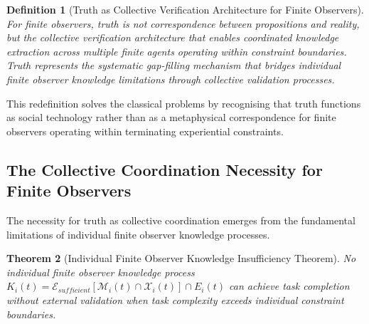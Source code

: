 \documentclass{article}
\newtheorem{theorem}{Theorem}[section]
\newtheorem{definition}[theorem]{Definition}
\begin{document}
\begin{definition}[Truth as Collective Verification Architecture for Finite Observers]
For finite observers, truth is not correspondence between propositions and reality, but the collective verification architecture that enables coordinated knowledge extraction across multiple finite agents operating within constraint boundaries. Truth represents the systematic gap-filling mechanism that bridges individual finite observer knowledge limitations through collective validation processes.
\end{definition}

This redefinition solves the classical problems by recognising that truth functions as social technology rather than as a metaphysical correspondence for finite observers operating within terminating experiential constraints.

\subsection{The Collective Coordination Necessity for Finite Observers}

The necessity for truth as collective coordination emerges from the fundamental limitations of individual finite observer knowledge processes.

\begin{theorem}[Individual Finite Observer Knowledge Insufficiency Theorem]
No individual finite observer knowledge process $K_i(t) = \mathcal{E}_{sufficient}[\mathcal{M}_i(t) \cap \mathcal{X}_i(t)] \cap E_i(t)$ can achieve task completion without external validation when task complexity exceeds individual constraint boundaries.
\end{theorem}
\end{document}
